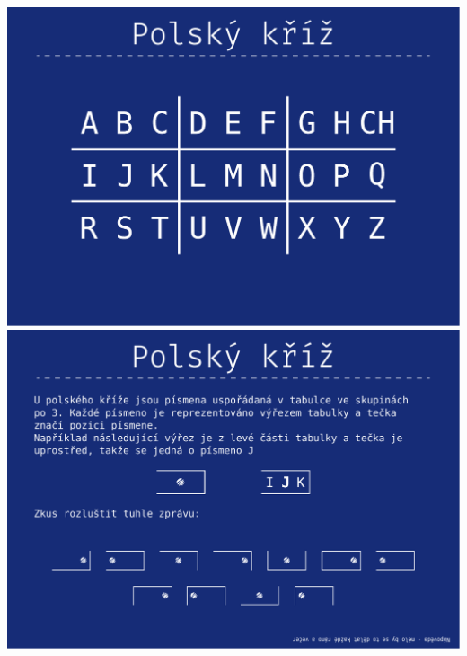 \documentclass[a4paper]{article}
\begin{document}
	\pagebreak
	\noindent
	\includegraphics[width=\textwidth]{ciphers/keys/polsky_kriz_0.pdf}
	\includegraphics[width=\textwidth]{ciphers/keys/polsky_kriz_1.pdf}
	
\end{document}
